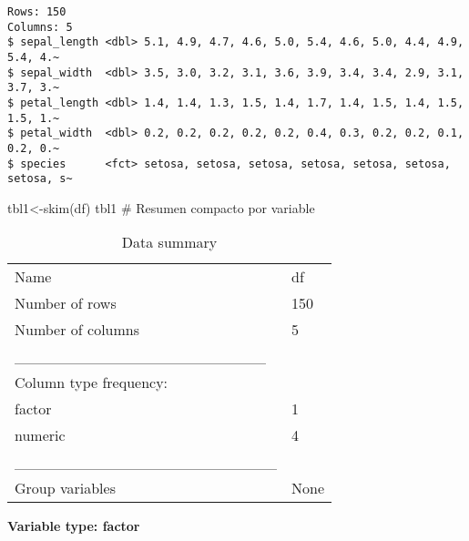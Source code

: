 \documentclass[
  spanish,
  11pt,
  a4paper,
  DIV=11,
  numbers=noendperiod]{scrartcl}
\newenvironment{Shaded}{\begin{snugshade}}{\end{snugshade}}
\newcommand{\CommentTok}[1]{\textcolor[rgb]{0.37,0.37,0.37}{#1}}
\newcommand{\FunctionTok}[1]{\textcolor[rgb]{0.28,0.35,0.67}{#1}}
\newcommand{\NormalTok}[1]{\textcolor[rgb]{0.00,0.23,0.31}{#1}}
\newcommand{\OtherTok}[1]{\textcolor[rgb]{0.00,0.23,0.31}{#1}}
\begin{document}
\begin{verbatim}
Rows: 150
Columns: 5
$ sepal_length <dbl> 5.1, 4.9, 4.7, 4.6, 5.0, 5.4, 4.6, 5.0, 4.4, 4.9, 5.4, 4.~
$ sepal_width  <dbl> 3.5, 3.0, 3.2, 3.1, 3.6, 3.9, 3.4, 3.4, 2.9, 3.1, 3.7, 3.~
$ petal_length <dbl> 1.4, 1.4, 1.3, 1.5, 1.4, 1.7, 1.4, 1.5, 1.4, 1.5, 1.5, 1.~
$ petal_width  <dbl> 0.2, 0.2, 0.2, 0.2, 0.2, 0.4, 0.3, 0.2, 0.2, 0.1, 0.2, 0.~
$ species      <fct> setosa, setosa, setosa, setosa, setosa, setosa, setosa, s~
\end{verbatim}

\begin{Shaded}
\begin{Highlighting}[numbers=left,,]
\NormalTok{tbl1}\OtherTok{\textless{}{-}}\FunctionTok{skim}\NormalTok{(df) }
\NormalTok{tbl1 }\CommentTok{\# Resumen compacto por variable}
\end{Highlighting}
\end{Shaded}

\begin{longtable}[]{@{}ll@{}}
\caption{Data summary}\tabularnewline
\toprule\noalign{}
\endfirsthead
\endhead
\bottomrule\noalign{}
\endlastfoot
Name & df \\
Number of rows & 150 \\
Number of columns & 5 \\
\_\_\_\_\_\_\_\_\_\_\_\_\_\_\_\_\_\_\_\_\_\_\_ & \\
Column type frequency: & \\
factor & 1 \\
numeric & 4 \\
\_\_\_\_\_\_\_\_\_\_\_\_\_\_\_\_\_\_\_\_\_\_\_\_ & \\
Group variables & None \\
\end{longtable}

\textbf{Variable type: factor}
\end{document}
